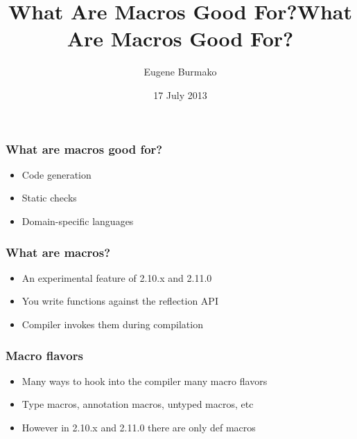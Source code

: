 \documentclass[svgnames,hyperref={bookmarks=false}]{beamer}
\title{What Are Macros Good For?}
\begin{document}
\title{What Are Macros Good For?}
\author{Eugene Burmako}
\date{17 July 2013}
{
\begin{frame}
  \titlepage
\end{frame}
}

\begin{frame}[fragile]
\frametitle{What are macros good for?}

\begin{itemize}
\item Code generation
\item Static checks
\item Domain-specific languages
\end{itemize}
\end{frame}

\begin{frame}[fragile]
\frametitle{}

\vskip40pt
\begin{center}
\end{center}
\end{frame}

\begin{frame}[fragile]
\frametitle{What are macros?}

\begin{itemize}
\item An experimental feature of 2.10.x and 2.11.0
\item You write functions against the reflection API
\item Compiler invokes them during compilation
\end{itemize}
\end{frame}

\begin{frame}[fragile]
\frametitle{Macro flavors}

\begin{itemize}
\item Many ways to hook into the compiler \text{\textrightarrow} many macro flavors
\item Type macros, annotation macros, untyped macros, etc
\item However in 2.10.x and 2.11.0 there are only def macros
\end{itemize}
\end{frame}
\end{document}
